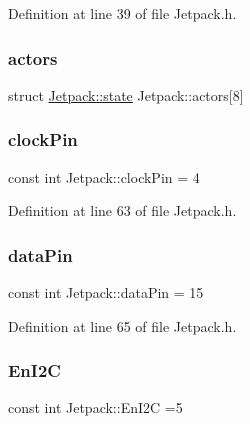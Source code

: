 Definition at line 39 of file Jetpack.\+h.

\mbox{\label{class_jetpack_a7e16d2f97837f9712a2e6de1c50d99db}} 
\subsubsection{\texorpdfstring{actors}{actors}}
{\footnotesize\ttfamily struct \hyperlink{struct_jetpack_1_1state}{Jetpack\+::state} Jetpack\+::actors\mbox{[}8\mbox{]}\hspace{0.3cm}{\ttfamily [private]}}

\mbox{\label{class_jetpack_a58ebb991f358f3ae94e82148b0221b5a}} 
\subsubsection{\texorpdfstring{clock\+Pin}{clockPin}}
{\footnotesize\ttfamily const int Jetpack\+::clock\+Pin = 4\hspace{0.3cm}{\ttfamily [private]}}



Definition at line 63 of file Jetpack.\+h.

\mbox{\label{class_jetpack_a3d669a56e93c71dd25f970d4ed7d0c00}} 
\subsubsection{\texorpdfstring{data\+Pin}{dataPin}}
{\footnotesize\ttfamily const int Jetpack\+::data\+Pin = 15\hspace{0.3cm}{\ttfamily [private]}}



Definition at line 65 of file Jetpack.\+h.

\mbox{\label{class_jetpack_a81df984fb4cea98c71aa1a1cfcdfe814}} 
\subsubsection{\texorpdfstring{En\+I2C}{EnI2C}}
{\footnotesize\ttfamily const int Jetpack\+::\+En\+I2C =5\hspace{0.3cm}{\ttfamily [private]}}



